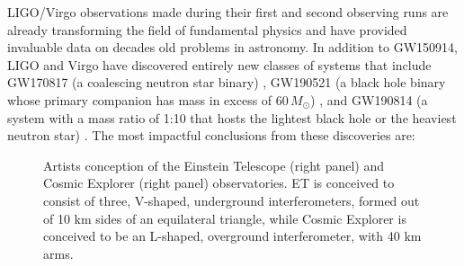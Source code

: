 \documentclass[twocolumn,aps,prd,nofootinbib,superscriptaddress,10pt,notitlepage,preprintnumbers] {revtex4-1}
\begin{document}
LIGO/Virgo observations made during their first and second observing runs are already transforming the field of fundamental physics and have provided invaluable data on decades old problems in astronomy. In addition to GW150914, LIGO and Virgo have discovered entirely new classes of systems that include GW170817 (a coalescing neutron star binary) \cite{GW170817}, GW190521 (a black hole binary whose primary companion has mass in excess of $60\,M_\odot$) \cite{}, and GW190814 (a system with a mass ratio of 1:10 that hosts the lightest  black hole or the heaviest neutron star) \cite{}. The most impactful conclusions from these discoveries are:

\begin{figure} 
\caption{Artists conception of the Einstein Telescope (right panel) and Cosmic Explorer (right panel) observatories.  ET is conceived to consist of three, V-shaped, underground interferometers, formed out of 10 km sides of an equilateral triangle, while  Cosmic Explorer is conceived to be an L-shaped, overground interferometer, with 40 km arms.}
\label{fig:3G}
\end{figure}
\end{document}
